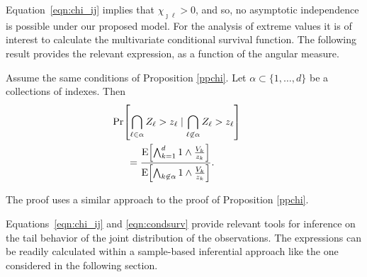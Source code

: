 Equation~\eqref{eqn:chi_ij} implies that $\chi_{\jmath\ell}>0$, and so, no asymptotic independence is possible 
  under our proposed model. For the analysis of extreme values it is of interest to calculate the multivariate 
  conditional survival function. The following result provides the relevant expression, as a function of the 
  angular measure.
  \begin{prop}
  Assume the same conditions of Proposition \ref{ppchi}.   Let $\alpha \subset \{1, \ldots ,d\}$ be a 
  collections of indexes.  Then     
  \begin{equation} \label{eqn:condsurv}
    \begin{aligned}
    &\hspace{-0.5cm}\mathrm{Pr}\left[\bigcap_{\ell \in \alpha} 
        Z_\ell > z_\ell \mid \bigcap_{\ell\not\in\alpha} Z_\ell > z_\ell\right] \\
    &= \frac{\expect{\bigwedge_{k = 1}^d 1\wedge \frac{V_k}{z_k}}}{\expect{\bigwedge_{k \not\in\alpha}1\wedge\frac{V_k}{z_k}}}.
    \end{aligned}
  \end{equation}
  \end{prop}  
  The proof uses a similar approach to the proof of Proposition \ref{ppchi}.

Equations~\eqref{eqn:chi_ij} and \eqref{eqn:condsurv} provide relevant tools for inference on the tail 
  behavior of the joint distribution of the observations. The expressions can be readily calculated 
  within a sample-based inferential approach like the one considered in the following section.


